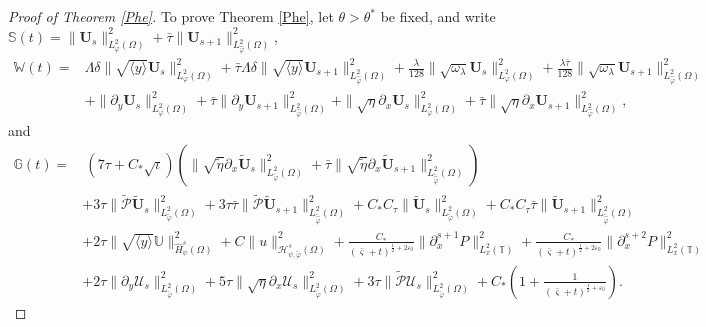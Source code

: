 \documentclass[10pt,a4paper]{amsart}
\newcommand\y{{{\langle y \rangle}}}
\begin{document}
\begin{proof}[Proof of Theorem \ref{Phe}]
To prove Theorem \ref{Phe}, let $\theta>\theta^{*}$ be fixed, and write
$\mathbb{S}(t)=\|\mathbf{U}_{s}\|_{L_{\varphi}^{2}(\Omega)}^{2}+\bar{\tau}\|\mathbf{U}_{s+1}\|_{L_{\hat{\varphi}}^{2}(\Omega)}^{2}$,
\begin{align*}
\mathbb{W}(t)
=&\Lambda\delta\|\sqrt{\y}\mathbf{U}_{s}\|_{L_{\varphi}^{2}(\Omega)}^{2}
 +\bar{\tau}\Lambda\delta\|\sqrt{\y}\mathbf{U}_{s+1}\|_{L_{\hat{\varphi}}^{2}(\Omega)}^{2}
 +\frac{\lambda}{128}\|\sqrt{\omega_{\lambda}}\mathbf{U}_{s}\|_{L_{\varphi}^{2}(\Omega)}^{2}
 +\frac{\lambda\bar{\tau}}{128}\|\sqrt{\omega_{\lambda}}\mathbf{U}_{s+1}\|_{L_{\hat{\varphi}}^{2}(\Omega)}^{2}\\
&+\|\partial_{y}\mathbf{U}_{s}\|_{L_{\varphi}^{2}(\Omega)}^{2}
 +\bar{\tau}\|\partial_{y}\mathbf{U}_{s+1}\|_{L_{\hat{\varphi}}^{2}(\Omega)}^{2}
 +\|\sqrt{\eta}\partial_{x}\mathbf{U}_{s}\|_{L_{\varphi}^{2}(\Omega)}^{2}
 +\bar{\tau}\|\sqrt{\eta}\partial_{x}\mathbf{U}_{s+1}\|_{L_{\hat{\varphi}}^{2}(\Omega)}^{2},
\end{align*}
and
\begin{align*}
\mathbb{G}(t)
=&~(7\tau+C_{*}\sqrt{\iota})\left(\|\sqrt{\tilde{\eta}}\partial_{x}\tilde{\mathbf{U}}_{s}\|_{L_{\tilde{\varphi}}^{2}(\Omega)}^{2}
                                     +\bar{\tau}\|\sqrt{\tilde{\eta}}\partial_{x}\tilde{\mathbf{U}}_{s+1}\|_{L_{\tilde{\hat{\varphi}}}^{2}(\Omega)}^{2}\right)\\
 &+3\tau\|\tilde{\mathcal{P}}\tilde{\mathbf{U}}_{s}\|_{L_{\tilde{\varphi}}^{2}(\Omega)}^{2}
  +3\tau\bar{\tau}\|\tilde{\mathcal{P}}\tilde{\mathbf{U}}_{s+1}\|_{L_{\tilde{\hat{\varphi}}}^{2}(\Omega)}^{2}
  +C_{*}C_{\tau}\|\tilde{\mathbf{U}}_{s}\|_{L_{\tilde{\varphi}}^{2}(\Omega)}^{2}
  +C_{*}C_{\tau}\bar{\tau}\|\tilde{\mathbf{U}}_{s+1}\|_{L_{\tilde{\hat{\varphi}}}^{2}(\Omega)}^{2}\nonumber\\
 &+2\tau\|\sqrt{\y}\mathbb{U}\|_{\hat{H}_{\psi}^{s}(\Omega)}^{2}
  +C\|u\|_{\mathcal{H}_{\psi,\tilde{\varphi}}^{s}(\Omega)}^{2}
  +\frac{C_{*}}{(\bar{\varsigma}+t)^{\frac{1}{2}+2\varepsilon_{0}}}\|\partial_{x}^{s+1}P\|_{L_{x}^{2}(\mathbb{T})}^{2}
  +\frac{C_{*}}{(\bar{\varsigma}+t)^{\frac{1}{2}+2\varepsilon_{0}}}\|\partial_{x}^{s+2}P\|_{L_{x}^{2}(\mathbb{T})}^{2}\nonumber\\
 &+2\tau\|\partial_{y}\mathcal{U}_{s}\|_{L_{\tilde{\varphi}}^{2}(\Omega)}^{2}
  +5\tau\|\sqrt{\eta}\partial_{x}\mathcal{U}_{s}\|_{L_{\tilde{\varphi}}^{2}(\Omega)}^{2}
  +3\tau\|\tilde{\mathcal{P}}\mathcal{U}_{s}\|_{L_{\tilde{\varphi}}^{2}(\Omega)}^{2}
  +C_{*}\left(1+\frac{1}{(\bar{\varsigma}+t)^{\frac{1}{2}+\varepsilon_{0}}}\right).\nonumber
\end{align*}


\end{proof}
\end{document}
